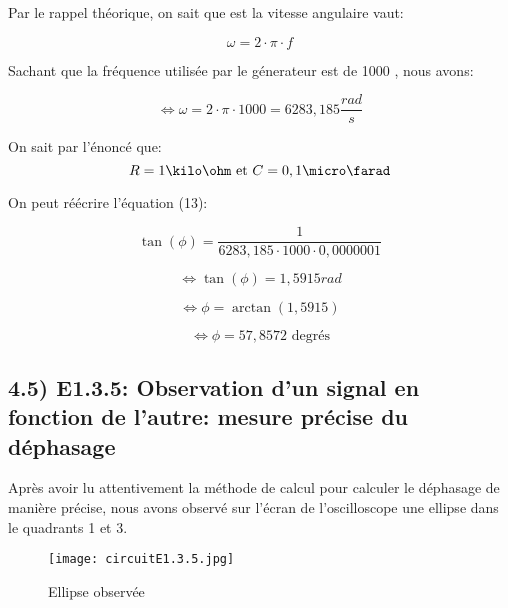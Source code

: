 \documentclass{report}
\begin{document}
Par le rappel th\'eorique, on sait que  est la vitesse angulaire vaut:

\begin{equation}
    \omega = 2\cdot \pi \cdot f   
\end{equation}

Sachant que la fr\'equence utilis\'ee par le g\'enerateur est de 1000 \hertz, nous avons:

\begin{equation}
    \Leftrightarrow \omega = 2 \cdot \pi \cdot 1000 = 6283,185 \frac{rad}{s}
\end{equation}

On sait par l'\'enonc\'e que:
\begin{equation}
    R = 1\kilo\ohm \text{ et } C = 0,1\micro\farad 
\end{equation}

On peut r\'e\'ecrire l'\'equation (13):

\begin{equation}
    \tan(\phi) = \frac{1}{6283,185 \cdot 1000 \cdot 0,0000001}
\end{equation}

\begin{equation}
    \Leftrightarrow \tan(\phi) = 1,5915 rad
\end{equation}

\begin{equation}
    \Leftrightarrow \phi = \arctan (1,5915)
\end{equation}

\begin{equation}
    \Leftrightarrow \phi = 57,8572 \text{ degr\'es}
\end{equation}

\subsection*{4.5) E1.3.5: Observation d'un signal en fonction de l'autre: mesure pr\'ecise du d\'ephasage}
\hspace*{0.5cm}
Apr\`es avoir lu attentivement la m\'ethode de calcul pour calculer le d\'ephasage de mani\`ere pr\'ecise, nous avons observ\'e sur l'\'ecran de l'oscilloscope une ellipse dans le quadrants 1 et 3.
\hspace*{0.5cm}
\begin{figure}[ht!]
\centering
\texttt{[image: circuitE1.3.5.jpg]}
\caption{Ellipse observ\'ee}
\label{overflow}
\end{figure}
\\
\end{document}

